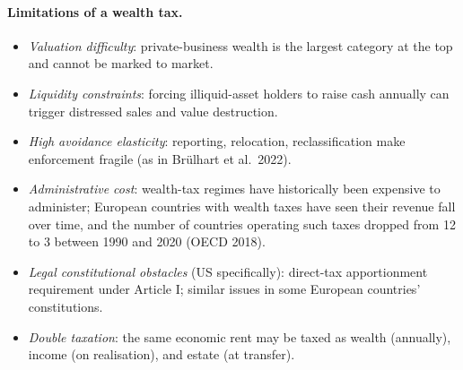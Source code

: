 \documentclass[11pt,a4paper]{article}
\begin{document}
\paragraph{Limitations of a wealth tax.}
\begin{itemize}[leftmargin=*,itemsep=1pt]
    \item \emph{Valuation difficulty}: private-business wealth is the largest category at the top and cannot be marked to market.
    \item \emph{Liquidity constraints}: forcing illiquid-asset holders to raise cash annually can trigger distressed sales and value destruction.
    \item \emph{High avoidance elasticity}: reporting, relocation, reclassification make enforcement fragile (as in Brülhart et al.\ 2022).
    \item \emph{Administrative cost}: wealth-tax regimes have historically been expensive to administer; European countries with wealth taxes have seen their revenue fall over time, and the number of countries operating such taxes dropped from 12 to 3 between 1990 and 2020 (OECD 2018).
    \item \emph{Legal constitutional obstacles} (US specifically): direct-tax apportionment requirement under Article I; similar issues in some European countries' constitutions.
    \item \emph{Double taxation}: the same economic rent may be taxed as wealth (annually), income (on realisation), and estate (at transfer).
\end{itemize}
\end{document}
